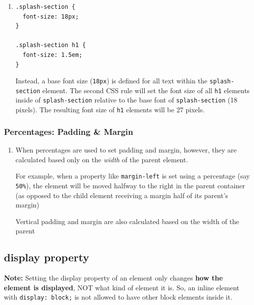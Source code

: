 \documentclass[a4paper, 12pt]{article}
\begin{document}
\begin{enumerate}
\item \begin{verbatim}
.splash-section {
  font-size: 18px;
}

.splash-section h1 {
  font-size: 1.5em;
}
\end{verbatim}
Instead, a base font size (\verb|18px|) is defined for all text within the \verb|splash-section| element. The second CSS rule will set the font size of all \verb|h1| elements inside of \verb|splash-section| relative to the base font of \verb|splash-section| (18 pixels). The resulting font size of \verb|h1| elements will be 27 pixels.
\end{enumerate}

\subsubsection{Percentages: Padding \& Margin}
\begin{enumerate}
\item When percentages are used to set padding and margin, however, they are calculated based only on the \textit{width} of the parent element.

For example, when a property like \verb|margin-left| is set using a percentage (say \verb|50%|), the element will be moved halfway to the right in the parent container (as opposed to the child element receiving a margin half of its parent's margin)

Vertical padding and margin are also calculated based on the width of the parent

\end{enumerate}

\subsection{display property}
\textbf{Note:} Setting the display property of an element only changes \textbf{how the element is displayed}, NOT what kind of element it is. So, an inline element with \verb|display: block;| is not allowed to have other block elements inside it.
\end{document}
